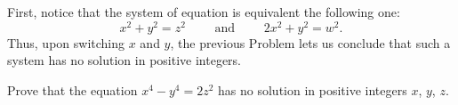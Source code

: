 \begin{solution}
    First, notice that the system of equation is equivalent the following one:
    $$x^2+y^2 = z^2 \qquad \text{ and } \qquad 2x^2 + y^2 = w^2.$$
    Thus, upon switching $x$ and $y$, the previous Problem lets us conclude that such a system has no solution in positive integers. \\
\end{solution}

\begin{exercise}
    Prove that the equation $x^4 - y^4 = 2z^2$ has no solution in positive integers $x$, $y$, $z$.  \\
\end{exercise}

